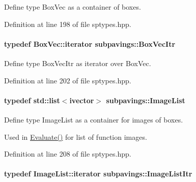 \-Define type \-Box\-Vec as a container of boxes. 



\-Definition at line 198 of file sptypes.\-hpp.

\hypertarget{namespacesubpavings_a8ea214a381f9c2027d0f605f2af25483}{
\paragraph[{\-Box\-Vec\-Itr}]{\setlength{\rightskip}{0pt plus 5cm}typedef \-Box\-Vec\-::iterator {\bf subpavings\-::\-Box\-Vec\-Itr}}}\label{namespacesubpavings_a8ea214a381f9c2027d0f605f2af25483}


\-Define type \-Box\-Vec\-Itr as iterator over \-Box\-Vec. 



\-Definition at line 202 of file sptypes.\-hpp.

\hypertarget{namespacesubpavings_acf161e8d79f04bf197a33277dd633f6d}{
\paragraph[{\-Image\-List}]{\setlength{\rightskip}{0pt plus 5cm}typedef std\-::list$<$ivector$>$ {\bf subpavings\-::\-Image\-List}}}\label{namespacesubpavings_acf161e8d79f04bf197a33277dd633f6d}


\-Define type \-Image\-List as a container for images of boxes. 

\-Used in \hyperlink{namespacesubpavings_aa47cfd8c78e0be2e255006d743ffd214}{\-Evaluate()} for list of function images. 

\-Definition at line 208 of file sptypes.\-hpp.

\hypertarget{namespacesubpavings_a8553bcc272ba9d0b7b9b6bd991b3bc00}{
\paragraph[{\-Image\-List\-Itr}]{\setlength{\rightskip}{0pt plus 5cm}typedef \-Image\-List\-::iterator {\bf subpavings\-::\-Image\-List\-Itr}}}\label{namespacesubpavings_a8553bcc272ba9d0b7b9b6bd991b3bc00}


